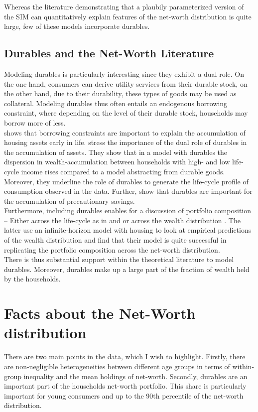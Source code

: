 \documentclass[12pt,a4paper,leqno]{article}
\theoremstyle{definition}
\begin{document}
Whereas the literature demonstrating that a plaubily parameterized version of the SIM can quantitatively explain features of the net-worth distribution is quite large, few of these models incorporate durables.

\subsection{Durables and the Net-Worth Literature}

Modeling durables is particularly interesting since they exhibit a dual role. On the one hand, consumers can derive utility services from their durable stock, on the other hand, due to their durability, these types of goods may be used as collateral. Modeling durables thus often entails an endogenous borrowing constraint, where depending on the level of their durable stock, households may borrow more of less. \\
\cite{yang2009} shows that borrowing constraints are important to explain the accumulation of housing assets early in life. \cite{FV&K2011} stress the importance of the dual role of durables in the accumulation of assets. They show that in a model with durables the dispersion in wealth-accumulation between households with high- and low life-cycle income rises compared to a model abstracting from durable goods. Moreover, they underline the role of durables to generate the life-cycle profile of consumption observed in the data. Further, \cite{gruber2003precautionary} show that durables are important for the accumulation of precautionary savings.    
\\
Furthermore, including durables enables for a discussion of portfolio composition \--- Either across the life-cycle as in \cite{yang2009} and \cite{FV&K2011} or across the wealth distribution \citep{diaz2010}. The latter use an infinite-horizon model with housing to look at empirical predictions of the wealth distribution and find that their model is quite successful in replicating the portfolio composition across the net-worth distribution.
\\
There is thus substantial support within the theoretical literature to model durables. Moreover, durables make up a large part of the fraction of wealth held by the households. 

\section{Facts about the Net-Worth distribution } \label{facts} There are two main points in the data, which I wish to highlight. Firstly, there are non-negligible heterogeneities between different age groups in terms of within-group inequality and the mean holdings of net-worth. Secondly, durables are an important part of the households net-worth portfolio. This share is particularly important for young consumers and up to the 90th percentile of the net-worth distribution. 
\end{document}

